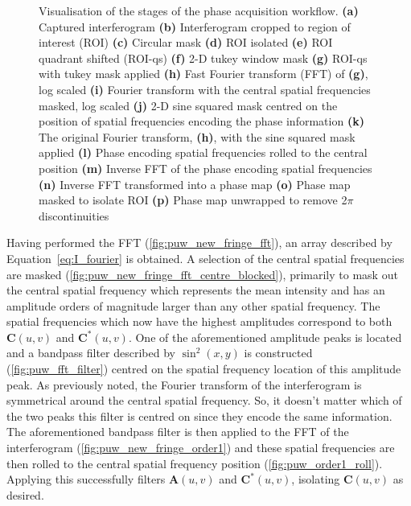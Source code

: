 \begin{figure}
\begin{subfigure}{0.23\textwidth}
		\caption{}
		\label{fig:puw_unwrapped_phase}
	\end{subfigure}
	\caption[Visualisation of the stages of the phase acquisition workflow.]{Visualisation of the stages of the phase acquisition workflow. \textbf{(a)} Captured interferogram \textbf{(b)} Interferogram cropped to region of interest (ROI) \textbf{(c)} Circular mask \textbf{(d)} ROI isolated \textbf{(e)} ROI quadrant shifted (ROI-qs) \textbf{(f)} 2-D tukey window mask \textbf{(g)} ROI-qs with tukey mask applied \textbf{(h)} Fast Fourier transform (FFT) of \textbf{(g)}, log scaled \textbf{(i)} Fourier transform with the central spatial frequencies masked, log scaled \textbf{(j)} 2-D sine squared mask centred on the position of spatial frequencies encoding the phase information \textbf{(k)} The original Fourier transform, \textbf{(h)}, with the sine squared mask applied \textbf{(l)} Phase encoding spatial frequencies rolled to the central position \textbf{(m)} Inverse FFT of the phase encoding spatial frequencies \textbf{(n)} Inverse FFT transformed into a phase map \textbf{(o)} Phase map masked to isolate ROI \textbf{(p)} Phase map unwrapped to remove 2$\pi$ discontinuities}
	\label{fig:phase_unwrap_workflow}
\end{figure}

Having performed the FFT (\ref{fig:puw_new_fringe_fft}), an array described by Equation~\ref{eq:I_fourier} is obtained. A selection of the central spatial frequencies are masked (\ref{fig:puw_new_fringe_fft_centre_blocked}), primarily to mask out the central spatial frequency which represents the mean intensity and has an amplitude orders of magnitude larger than any other spatial frequency. The spatial frequencies which now have the highest amplitudes correspond to both $\boldsymbol{C}(u,v)$ and $\boldsymbol{C}^{*}(u,v)$. One of the aforementioned amplitude peaks is located and a bandpass filter described by $\sin^{2}(x,y)$ is constructed (\ref{fig:puw_fft_filter}) centred on the spatial frequency location of this amplitude peak. As previously noted, the Fourier transform of the interferogram is symmetrical around the central spatial frequency. So, it doesn't matter which of the two peaks this filter is centred on since they encode the same information. The aforementioned bandpass filter is then applied to the FFT of the interferogram (\ref{fig:puw_new_fringe_order1}) and these spatial frequencies are then rolled to the central spatial frequency position (\ref{fig:puw_order1_roll}). Applying this successfully filters $\boldsymbol{A}(u,v)$ and $\boldsymbol{C}^{*}(u,v)$, isolating $\boldsymbol{C}(u,v)$ as desired.

